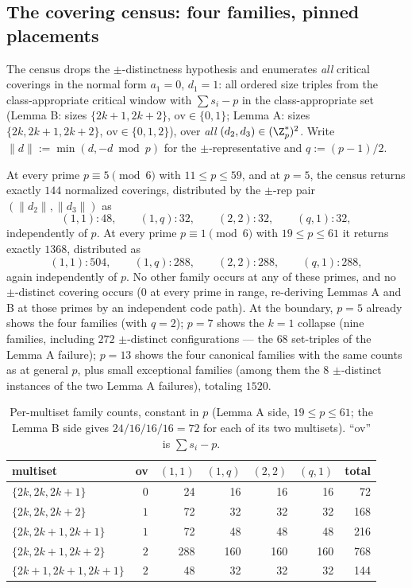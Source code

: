 \subsection{The covering census: four families, pinned placements}
\label{sec:gt-census}

The census drops the $\pm$-distinctness hypothesis and enumerates
\emph{all} critical coverings in the normal form $a_1=0$, $d_1=1$: all
ordered size triples from the class-appropriate critical window with
$\sum s_i-p$ in the class-appropriate set (Lemma B: sizes
$\{2k{+}1,2k{+}2\}$, $\mathrm{ov}\in\{0,1\}$; Lemma A: sizes
$\{2k,2k{+}1,2k{+}2\}$, $\mathrm{ov}\in\{0,1,2\}$), over \emph{all}
$(d_2,d_3)\in(\Z_p^{*})^2$. Write $\|d\|:=\min(d,-d \bmod p)$ for the
$\pm$-representative and $q:=(p-1)/2$.

\begin{proposition}\label{prop:census}
At every prime $p\equiv5\pmod 6$ with $11\le p\le 59$, and at $p=5$, the
census returns exactly $144$ normalized coverings, distributed by the
$\pm$-rep pair $(\|d_2\|,\|d_3\|)$ as
\[
(1,1):48,\qquad (1,q):32,\qquad (2,2):32,\qquad (q,1):32,
\]
independently of $p$. At every prime $p\equiv1\pmod 6$ with $19\le p\le 61$
it returns exactly $1368$, distributed as
\[
(1,1):504,\qquad (1,q):288,\qquad (2,2):288,\qquad (q,1):288,
\]
again independently of $p$. No other family occurs at any of these primes,
and no $\pm$-distinct covering occurs ($0$ at every prime in range,
re-deriving Lemmas A and B at those primes by an independent code path).
At the boundary, $p=5$ already shows the four families (with $q=2$); $p=7$
shows the $k=1$ collapse (nine families, including $272$ $\pm$-distinct
configurations --- the $68$ set-triples of the Lemma A failure); $p=13$
shows the four canonical families with the same counts as at general $p$,
plus small exceptional families (among them the $8$ $\pm$-distinct
instances of the two Lemma A failures), totaling $1520$.
\end{proposition}

\begin{table}[t]
\centering
\small
\caption{Per-multiset family counts, constant in $p$ (Lemma A side, $19\le
p\le 61$; the Lemma B side gives $24/16/16/16=72$ for each of its two
multisets). ``ov'' is $\sum s_i-p$.}
\label{tab:permultiset}
\begin{tabular}{@{}lrrrrrr@{}}
\toprule
multiset & ov & $(1,1)$ & $(1,q)$ & $(2,2)$ & $(q,1)$ & total \\
\midrule
$\{2k,2k,2k{+}1\}$ & $0$ & 24 & 16 & 16 & 16 & 72 \\
$\{2k,2k,2k{+}2\}$ & $1$ & 72 & 32 & 32 & 32 & 168 \\
$\{2k,2k{+}1,2k{+}1\}$ & $1$ & 72 & 48 & 48 & 48 & 216 \\
$\{2k,2k{+}1,2k{+}2\}$ & $2$ & 288 & 160 & 160 & 160 & 768 \\
$\{2k{+}1,2k{+}1,2k{+}1\}$ & $2$ & 48 & 32 & 32 & 32 & 144 \\
\bottomrule
\end{tabular}
\end{table}

